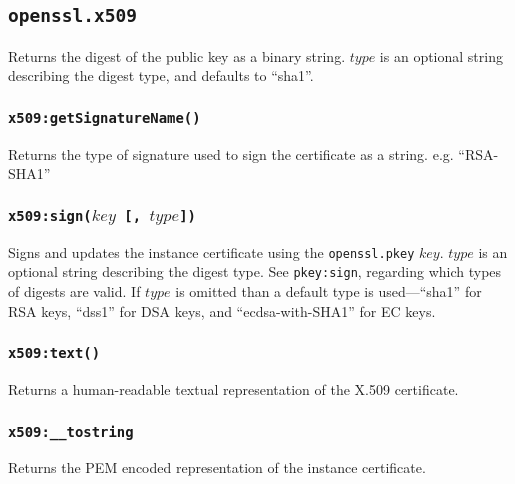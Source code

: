 \documentclass[11pt, oneside]{memoir}
\newcommand*{\fn}[1]{\texttt{#1}\xspace}
\newcommand*{\module}[1]{\texttt{#1}\xspace}
\newcounter{toccols}
\newenvironment{Module}[1]{
	\subsection{\texttt{#1}}
	\addtocontents{toc}{
		\protect\begin{multicols}{\value{toccols}}
	}
}{
	\addtocontents{toc}{\protect\end{multicols}}
}
\begin{document}
\begin{Module}{openssl.x509}
Returns the digest of the public key as a binary string. $type$ is an optional string describing the digest type, and defaults to ``sha1''.

\subsubsection[\fn{x509:getSignatureName}]{\fn{x509:getSignatureName()}}

Returns the type of signature used to sign the certificate as a string. e.g. ``RSA-SHA1''

\subsubsection[\fn{x509:sign}]{\fn{x509:sign($key$ [, $type$])}}

Signs and updates the instance certificate using the \module{openssl.pkey} $key$. $type$ is an optional string describing the digest type. See \module{pkey:sign}, regarding which types of digests are valid. If $type$ is omitted than a default type is used---``sha1'' for RSA keys, ``dss1'' for DSA keys, and ``ecdsa-with-SHA1'' for EC keys.

\subsubsection[\fn{x509:text}]{\fn{x509:text()}}

Returns a human-readable textual representation of the X.509 certificate.

\subsubsection[\fn{x509:\_\_tostring}]{\fn{x509:\_\_tostring}}

Returns the PEM encoded representation of the instance certificate.

\end{Module}
\end{document}
